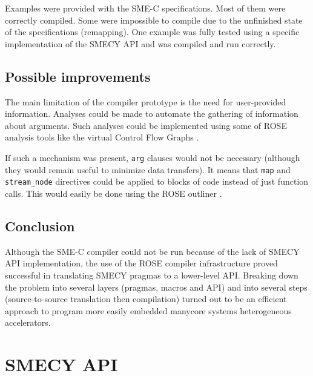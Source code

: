\documentclass[a4paper]{article}
\begin{document}
	Examples were provided with the SME-C specifications. Most of them were correctly compiled. Some were impossible to compile due to the unfinished state of the specifications (remapping). One example was fully tested using a specific implementation of the SMECY API and was compiled and run correctly.
	
	\subsection{Possible improvements}
	The main limitation of the compiler prototype is the need for user-provided information. Analyses could be made to automate the gathering of information about arguments. Such analyses could be implemented using some of ROSE analysis tools like the virtual Control Flow Graphs \cite{tuto}.
	
	If such a mechanism was present, \verb+arg+ clauses would not be necessary (although they would remain useful to minimize data transfers). It means that \verb+map+ and \verb+stream_node+ directives could be applied to blocks of code instead of just function calls. This would easily be done using the ROSE outliner \cite{tuto,outliner}.
	
	\subsection{Conclusion}
	Although the SME-C compiler could not be run because of the lack of
    SMECY API implementation, the use of the ROSE compiler infrastructure
    proved successful in translating SMECY pragmas to a lower-level
    API. Breaking down the problem into several layers (pragmas, macros
    and API) and into several steps (source-to-source translation then
    compilation) turned out to be an efficient approach to program more
    easily embedded manycore systems heterogeneous accelerators.
	
	
	\newpage
	\appendix
	\section{SMECY API}
	\label{api}
\end{document}
